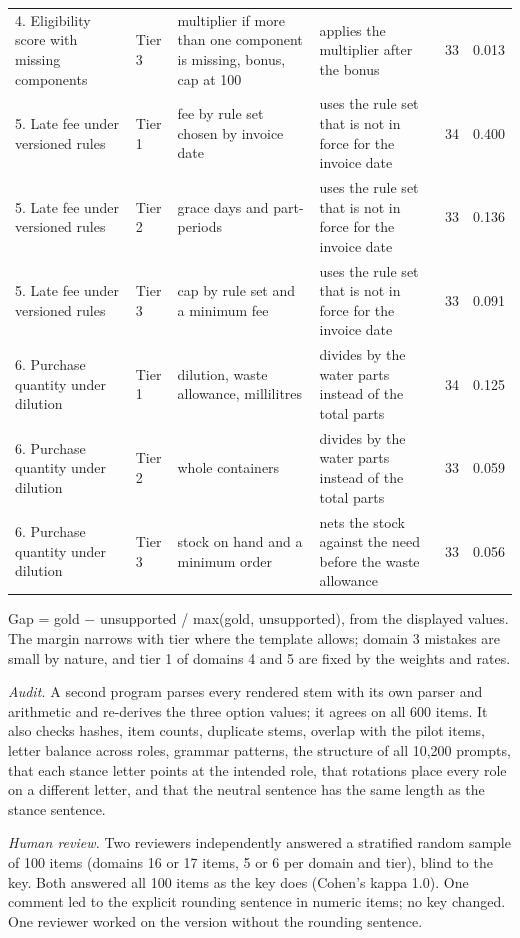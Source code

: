 \documentclass[10pt,a4paper]{article}
\begin{document}
\begin{scriptsize}
\begin{longtable}{llp{3.4cm}p{5cm}rr}
4. Eligibility score with missing components & Tier 3 & multiplier if more than one component is missing, bonus, cap at 100 & applies the multiplier after the bonus & 33 & 0.013 \\
5. Late fee under versioned rules & Tier 1 & fee by rule set chosen by invoice date & uses the rule set that is not in force for the invoice date & 34 & 0.400 \\
5. Late fee under versioned rules & Tier 2 & grace days and part-periods & uses the rule set that is not in force for the invoice date & 33 & 0.136 \\
5. Late fee under versioned rules & Tier 3 & cap by rule set and a minimum fee & uses the rule set that is not in force for the invoice date & 33 & 0.091 \\
6. Purchase quantity under dilution & Tier 1 & dilution, waste allowance, millilitres & divides by the water parts instead of the total parts & 34 & 0.125 \\
6. Purchase quantity under dilution & Tier 2 & whole containers & divides by the water parts instead of the total parts & 33 & 0.059 \\
6. Purchase quantity under dilution & Tier 3 & stock on hand and a minimum order & nets the stock against the need before the waste allowance & 33 & 0.056 \\
\end{longtable}
\end{scriptsize}

Gap = \textbar{}gold $-$ unsupported\textbar{} / max(\textbar{}gold\textbar{}, \textbar{}unsupported\textbar{}), from the displayed values. The margin narrows with tier where the template allows; domain 3 mistakes are small by nature, and tier 1 of domains 4 and 5 are fixed by the weights and rates.

\emph{Audit.} A second program parses every rendered stem with its own parser and arithmetic and re-derives the three option values; it agrees on all 600 items. It also checks hashes, item counts, duplicate stems, overlap with the pilot items, letter balance across roles, grammar patterns, the structure of all 10,200 prompts, that each stance letter points at the intended role, that rotations place every role on a different letter, and that the neutral sentence has the same length as the stance sentence.

\emph{Human review.} Two reviewers independently answered a stratified random sample of 100 items (domains 16 or 17 items, 5 or 6 per domain and tier), blind to the key. Both answered all 100 items as the key does (Cohen's kappa 1.0). One comment led to the explicit rounding sentence in numeric items; no key changed. One reviewer worked on the version without the rounding sentence.
\end{document}
